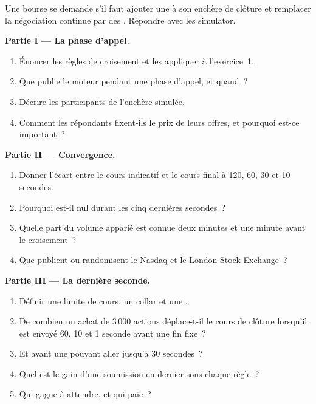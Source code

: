 \begin{problem}\label{pb:mx:auction-mechanics-and-theory:1}
Une bourse se demande s'il faut ajouter une  à son enchère de clôture et remplacer la négociation continue par des . Répondre avec les
simulator.

\medskip\noindent\textbf{Partie I --- La phase d'appel.}
\begin{enumerate}
\item Énoncer les règles de croisement et les appliquer à l'exercice~1.
\item Que publie le moteur pendant une phase d'appel, et quand~?
\item Décrire les participants de l'enchère simulée.
\item Comment les répondants fixent-ils le prix de leurs offres, et pourquoi est-ce important~?
\end{enumerate}

\medskip\noindent\textbf{Partie II --- Convergence.}
\begin{enumerate}[resume]
\item Donner l'écart entre le cours indicatif et le cours final à 120, 60, 30 et 10 secondes.
\item Pourquoi est-il nul durant les cinq dernières secondes~?
\item Quelle part du volume apparié est connue deux minutes et une minute avant le croisement~?
\item Que publient ou randomisent le Nasdaq et le London Stock Exchange~?
\end{enumerate}

\medskip\noindent\textbf{Partie III --- La dernière seconde.}
\begin{enumerate}[resume]
\item Définir une limite de cours, un collar et une .
\item De combien un achat de 3\,000 actions déplace-t-il le cours de clôture lorsqu'il est envoyé 60, 10 et 1 seconde avant une fin fixe~?
\item Et avant une  pouvant aller jusqu'à 30 secondes~?
\item Quel est le gain d'une soumission en dernier sous chaque règle~?
\item Qui gagne à attendre, et qui paie~?
\end{enumerate}


\end{problem}
